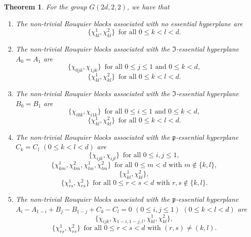 \documentclass[10pt,a4paper,titlepage]{article}
\newtheorem{theorem}{Theorem}[section]
\begin{document}
\begin{theorem}\label{yes proof} For the group $G(2d,2,2)$, we have that
\begin{enumerate}[(1)]
\item The non-trivial Rouquier blocks associated with no essential hyperplane are 
$$\{\chi_{kl}^{1},\chi_{kl}^{2}\} \,\textrm{ for all } 0 \leq k<l<d.$$
\item The non-trivial Rouquier blocks associated with the $\mathfrak{I}$-essential hyperplane $A_0=A_1$ are
$$\{\chi_{0jk},\chi_{1jk}\}\, \textrm{ for all } 0 \leq j \leq 1 \textrm{ and } 0 \leq k<d,$$
$$\{\chi_{kl}^{1},\chi_{kl}^{2}\}\, \textrm{ for all } 0 \leq k<l<d.$$
\item The non-trivial Rouquier blocks associated with the $\mathfrak{I}$-essential hyperplane $B_0=B_1$ are
$$\{\chi_{i0k},\chi_{i1k}\} \,\textrm{ for all } 0 \leq i \leq 1 \textrm{ and } 0 \leq k<d,$$
$$\{\chi_{kl}^{1},\chi_{kl}^{2}\}\, \textrm{ for all } 0 \leq k<l<d.$$
\item The non-trivial Rouquier blocks associated with the $\mathfrak{p}$-essential hyperplane $C_k=C_l$ $(0 \leq k<l<d)$ are
$$ \{\chi_{ijk},\chi_{ijl}\}\, \textrm{ for all } 0 \leq i,j \leq 1,$$
$$\{\chi_{km}^{1},\chi_{km}^{2},\chi_{lm}^{1},\chi_{lm}^{2}\}\, \textrm{ for all } 0 \leq m <d \textrm{ with } m \notin \{k,l\},$$
$$\{\chi_{kl}^{1},\chi_{kl}^{2}\},$$
$$\{\chi_{rs}^{1},\chi_{rs}^{2}\}\, \textrm{ for all } 0 \leq r<s<d \textrm{ with } r,s \notin \{k,l\}.$$
\item The non-trivial Rouquier blocks associated with the $\mathfrak{p}$-essential hyperplane $A_i-A_{1-i}+B_j-B_{1-j}+C_k-C_l=0$ $(0 \leq i,j\leq 1)$ $(0 \leq k<l<d)$ are
$$\{\chi_{ijk},\chi_{1-i,1-j,l}, \chi_{kl}^{1},\chi_{kl}^{2} \}, $$
$$\{\chi_{rs}^{1},\chi_{rs}^{2}\}\, \textrm{ for all } 0 \leq r<s<d \textrm{ with } (r,s)  \neq (k,l).$$
\end{enumerate}
\end{theorem}
\end{document}
